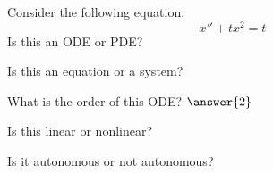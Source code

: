 \documentclass{ximera}
\begin{document}
\begin{exercise}
    Consider the following equation:  
    \[
        x''+tx^2=t
    \]
    Is this an ODE or PDE?
    \begin{multipleChoice}
    \end{multipleChoice}
    \begin{problem}
        Is this an equation or a system?
        \begin{multipleChoice}
        \end{multipleChoice}
        
        \begin{problem}
            What is the order of this ODE? $\answer{2}$
            
            \begin{problem}
                Is this linear or nonlinear?
                \begin{multipleChoice}
                \end{multipleChoice}
                
%                    
            \end{problem}
        \end{problem}
    \end{problem}
    \begin{problem}
        Is it autonomous or not autonomous?
        \begin{multipleChoice}
        \end{multipleChoice}
    \end{problem}
\end{exercise}
\end{document}
